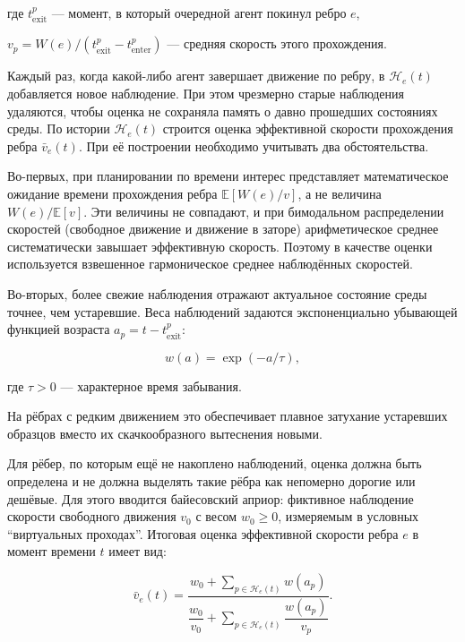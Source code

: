 где $t^{p}_{\mathrm{exit}}$ --- момент, в который очередной агент покинул ребро $e$,\par
$v_p = W(e) / (t^{p}_{\mathrm{exit}} - t^{p}_{\mathrm{enter}})$ --- средняя скорость
этого прохождения.

Каждый раз, когда какой-либо агент завершает движение по ребру, в $\mathcal{H}_e(t)$ добавляется 
новое наблюдение. При этом чрезмерно старые наблюдения удаляются, чтобы оценка не сохраняла память о давно 
прошедших состояниях среды. По истории $\mathcal{H}_e(t)$ строится оценка эффективной скорости 
прохождения ребра $\bar{v}_e(t)$. При её построении необходимо учитывать два обстоятельства.

Во-первых, при планировании по времени интерес представляет математическое ожидание времени прохождения ребра 
$\mathbb{E}[W(e) / v]$, а не величина $W(e) / \mathbb{E}[v]$. Эти величины не совпадают, и при 
бимодальном распределении скоростей (свободное движение и движение в заторе) арифметическое среднее 
систематически завышает эффективную скорость. Поэтому в качестве оценки используется взвешенное 
гармоническое среднее наблюдённых скоростей.

Во-вторых, более свежие наблюдения отражают актуальное состояние среды точнее, чем устаревшие. Веса 
наблюдений задаются экспоненциально убывающей функцией возраста $a_p = t - t^{p}_{\mathrm{exit}}$:

\begin{equation}
    w(a) = \exp\!\left( -a / \tau \right),
\label{e:stat-weights}
\end{equation}

где $\tau > 0$ --- характерное время забывания.

На рёбрах с редким движением это обеспечивает плавное 
затухание устаревших образцов вместо их скачкообразного вытеснения новыми.

Для рёбер, по которым ещё не накоплено наблюдений, оценка должна быть определена и не должна выделять 
такие рёбра как непомерно дорогие или дешёвые. Для этого вводится байесовский априор: фиктивное 
наблюдение скорости свободного движения $v_0$ с весом $w_0 \geq 0$, измеряемым в условных 
\enquote{виртуальных проходах}. Итоговая оценка эффективной скорости ребра $e$ в момент времени 
$t$ имеет вид:

\begin{equation}
    \bar{v}_e(t) = \frac{w_0 + \sum\limits_{p \in \mathcal{H}_e(t)} w(a_p)}
                        {\dfrac{w_0}{v_0} + \sum\limits_{p \in \mathcal{H}_e(t)} \dfrac{w(a_p)}{v_p}}.
\label{e:stat-speed}
\end{equation}

